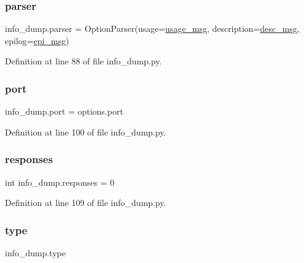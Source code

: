 \subsubsection{\texorpdfstring{parser}{parser}}
{\footnotesize\ttfamily info\+\_\+dump.\+parser = Option\+Parser(usage=\hyperlink{namespaceinfo__dump_a90a3cf17b0c24ded2ef387fa67ef7f1e}{usage\+\_\+msg}, description=\hyperlink{namespaceinfo__dump_afa18e188fcfcb13b0f16523f97422078}{desc\+\_\+msg}, epilog=\hyperlink{namespaceinfo__dump_a20ba822326945097385577b53888d244}{epi\+\_\+msg})}



Definition at line 88 of file info\+\_\+dump.\+py.

\mbox{\label{namespaceinfo__dump_a6a0b57c32b7abb158439bb4e8b370c45}} 
\subsubsection{\texorpdfstring{port}{port}}
{\footnotesize\ttfamily info\+\_\+dump.\+port = options.\+port}



Definition at line 100 of file info\+\_\+dump.\+py.

\mbox{\label{namespaceinfo__dump_a41f2b166246844d080d65665e4335e98}} 
\subsubsection{\texorpdfstring{responses}{responses}}
{\footnotesize\ttfamily int info\+\_\+dump.\+responses = 0}



Definition at line 109 of file info\+\_\+dump.\+py.

\mbox{\label{namespaceinfo__dump_ac238d5ac975ddd9eb9ea696b9dabe4b2}} 
\subsubsection{\texorpdfstring{type}{type}}
{\footnotesize\ttfamily info\+\_\+dump.\+type}



